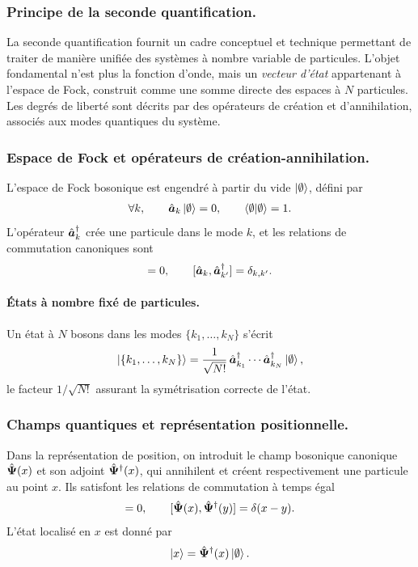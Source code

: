 \subsubsection{Principe de la seconde quantification.}
La seconde quantification fournit un cadre conceptuel et technique permettant de traiter de manière unifiée des systèmes à nombre variable de particules. L’objet fondamental n’est plus la fonction d’onde, mais un \emph{vecteur d’état} appartenant à l’espace de Fock, construit comme une somme directe des espaces à $N$ particules. Les degrés de liberté sont décrits par des opérateurs de création et d’annihilation, associés aux modes quantiques du système.

\subsubsection{Espace de Fock et opérateurs de création-annihilation.}
L’espace de Fock bosonique est engendré à partir du vide $\ket{\emptyset}$, défini par
\begin{eqnarray}
    \forall k,\qquad \hat{\bm{a}}_k \ket{\emptyset} = 0,
\qquad \langle \emptyset \vert \emptyset \rangle = 1.
\end{eqnarray}
L’opérateur $\hat{\bm{a}}_k^\dagger$ crée une particule dans le mode $k$, et les relations de commutation canoniques sont
\begin{eqnarray}
    [\operator{a}_k,\operator{a}_{k'}]=0, \qquad [\operator{a}_k,\operator{a}_{k'}^\dagger]=\delta_{k,k'}.
\end{eqnarray}

\paragraph{États à nombre fixé de particules.}
Un état à $N$ bosons dans les modes $\{k_1,\dots,k_N\}$ s’écrit
\begin{eqnarray}
    \ket{\{k_1,\dots,k_N\}}
=
\frac{1}{\sqrt{N!}}\,
\hat{\bm{a}}_{k_1}^\dagger \cdots \hat{\bm{a}}_{k_N}^\dagger
\ket{\emptyset},
\end{eqnarray}
le facteur $1/\sqrt{N!}$ assurant la symétrisation correcte de l’état.

\subsubsection{Champs quantiques et représentation positionnelle.}
Dans la représentation de position, on introduit le champ bosonique canonique
$\hat{\bm{\Psi}}(x)$ et son adjoint $\hat{\bm{\Psi}}^\dagger(x)$,
qui annihilent et créent respectivement une particule au point $x$.
Ils satisfont les relations de commutation à temps égal
\begin{eqnarray}
    [\operator{\Psi}(x),\operator{\Psi}(y)] = 0,
\qquad
[\operator{\Psi}(x),\operator{\Psi}^\dagger(y)] = \delta(x-y).
\end{eqnarray}
L’état localisé en $x$ est donné par
\begin{eqnarray}
    \ket{x} = \hat{\bm{\Psi}}^\dagger(x)\ket{\emptyset}.
\end{eqnarray}

